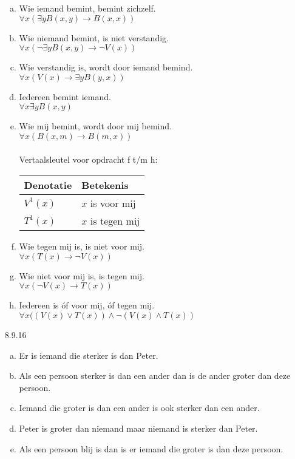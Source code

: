 \begin{enumerate}
\begin{enumerate}[(a)]
      \item
        Wie iemand bemint, bemint zichzelf.\\
        $\forall x ( \exists y B(x,y) \rightarrow B(x,x) )$
      \item
        Wie niemand bemint, is niet verstandig.\\
        $\forall x ( \neg \exists y B(x,y) \rightarrow \neg V(x))$
      \item
        Wie verstandig is, wordt door iemand bemind.\\
        $\forall x ( V(x) \to \exists y B(y,x))$
      \item
        Iedereen bemint iemand.\\
        $\forall x \exists y B(x,y)$
      \item
        Wie mij bemint, wordt door mij bemind.\\
        $\forall x ( B(x,m) \to B(m,x))$
        \\\\
        Vertaalsleutel voor opdracht f t/m h: \\
        \begin{tabular}{l|l}
          Denotatie & Betekenis\\
          \hline
          $V^1(x)$ & $x$ is voor mij\\
          $T^1(x)$ & $x$ is tegen mij\\
        \end{tabular}
      \item
        Wie tegen mij is, is niet voor mij.\\
        $\forall x ( T(x) \rightarrow \neg V(x) )$
      \item
        Wie niet voor mij is, is tegen mij.\\
        $\forall x ( \neg V(x) \rightarrow T(x) )$
      \item
        Iedereen is óf voor mij, óf tegen mij.\\
        $\forall x ( ( V(x) \vee T(x) ) \land \neg( V(x) \land T(x) )$
    \end{enumerate}

    \item[8.9.16]

    \begin{enumerate}[(a)]
      \item Er is iemand die sterker is dan Peter.

      \item Als een persoon sterker is dan een ander dan is de ander groter dan deze persoon.

      \item Iemand die groter is dan een ander is ook sterker dan een ander.

      \item Peter is groter dan niemand maar niemand is sterker dan Peter.

      \item Als een persoon blij is dan is er iemand die groter is dan deze persoon.
    \end{enumerate}

\end{enumerate}

